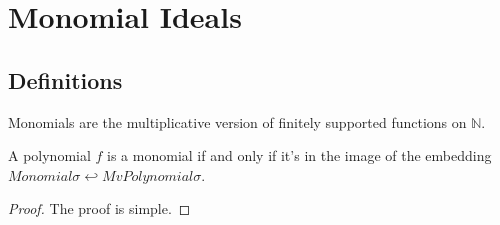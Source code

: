 %

\chapter{Monomial Ideals}

\section{Definitions}

\begin{definition}[Monomial]\label{defn:monomial}
    \leanok
    Monomials are the multiplicative version of finitely supported functions on $\mathbb{N}$.    
\end{definition}

\begin{theorem}[IsMonomialiffrange]\label{thm:IsMonomial_iff_range}
    \leanok
    A polynomial $f$ is a monomial if and only if it's in the image of the 
    embedding $Monomial \sigma \hookleftarrow MvPolynomial \sigma$.
\end{theorem}
\begin{proof}\leanok
    The proof is simple.
\end{proof}
